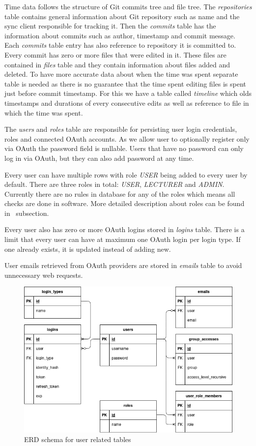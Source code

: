 Time data follows the structure of Git commits tree and file tree.
The \textit{repositories} table contains general information about Git repository such as name and the sync client
responsible for tracking it.
Then the \textit{commits} table has the information about commits such as author, timestamp and commit message.
Each \textit{commits} table entry has also reference to repository it is committed to.
Every commit has zero or more files that were edited in it.
These files are contained in \textit{files} table and they contain information about files added and deleted.
To have more accurate data about when the time was spent separate table is needed as there is no guarantee that
the time spent editing files is spent just before commit timestamp.
For this we have a table called \textit{timeline} which olds timestamps and durations of every consecutive edits as
well as reference to file in which the time was spent.

The \textit{users} and \textit{roles} table are responsible for persisting user login credentials, roles and connected OAuth accounts.
As we allow user to optionally register only via OAuth the password field is nullable.
Users that have no password can only log in via OAuth, but they can also add password at any time.

Every user can have multiple rows with role \textit{USER} being added to every user by default.
There are three roles in total: \textit{USER}, \textit{LECTURER} and \textit{ADMIN}.
Currently there are no rules in database for any of the roles which means all checks are done in software.
More detailed description about roles can be found in~ subsection.

Every user also has zero or more OAuth logins stored in \textit{logins} table.
There is a limit that every user can have at maximum one OAuth login per login type.
If one already exists, it is updated instead of adding new.

User emails retrieved from OAuth providers are stored in \textit{emails} table to avoid unnecessary web requests.

\begin{figure}[H]
    \includegraphics[width=\textwidth]{figures/erd_schema_user}
    \caption{ERD schema for user related tables}
    \label{fig:erd-schema-user}
\end{figure}


